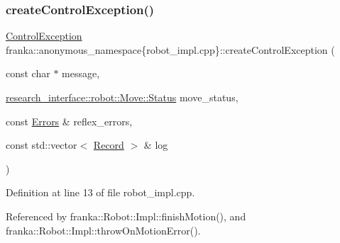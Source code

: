 \subsubsection{\texorpdfstring{create\+Control\+Exception()}{createControlException()}}
{\footnotesize\ttfamily \hyperlink{structfranka_1_1ControlException}{Control\+Exception} franka\+::anonymous\+\_\+namespace\{robot\+\_\+impl.\+cpp\}\+::create\+Control\+Exception (\begin{DoxyParamCaption}\item[{const char $\ast$}]{message,  }\item[{\hyperlink{structresearch__interface_1_1robot_1_1Move_a74e15d249324a1b2d28f0a7cf50dc794}{research\+\_\+interface\+::robot\+::\+Move\+::\+Status}}]{move\+\_\+status,  }\item[{const \hyperlink{structfranka_1_1Errors}{Errors} \&}]{reflex\+\_\+errors,  }\item[{const std\+::vector$<$ \hyperlink{structfranka_1_1Record}{Record} $>$ \&}]{log }\end{DoxyParamCaption})\hspace{0.3cm}{\ttfamily [inline]}}



Definition at line 13 of file robot\+\_\+impl.\+cpp.



Referenced by franka\+::\+Robot\+::\+Impl\+::finish\+Motion(), and franka\+::\+Robot\+::\+Impl\+::throw\+On\+Motion\+Error().



